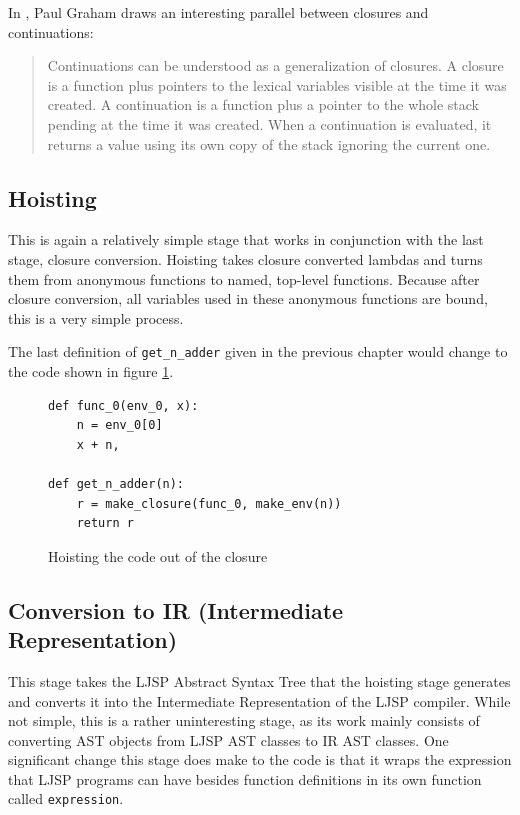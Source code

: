 \documentclass[11pt]{report}
\begin{document}
In \cite{onlisp}, Paul Graham draws an interesting parallel between closures and continuations:
\begin{quote}
Continuations can be understood as a generalization of closures. A closure is a function plus pointers to the lexical variables visible at the time it was created. A continuation is a function plus a pointer to the whole stack pending at the time it was created. When a continuation is evaluated, it returns a value using its own copy of the stack ignoring the current one.
\end{quote}



\subsection{Hoisting}
This is again a relatively simple stage that works in conjunction with the last stage, closure conversion. Hoisting takes closure converted lambdas and turns them from anonymous functions to named, top-level functions. Because after closure conversion, all variables used in these anonymous functions are bound, this is a very simple process.

The last definition of \texttt{get_n_adder} given in the previous chapter would change to the code shown in figure \ref{hoisting}.

\begin{figure}[ht]
\begin{lstlisting}
def func_0(env_0, x):
    n = env_0[0]
    x + n, 
    
def get_n_adder(n):
    r = make_closure(func_0, make_env(n))
    return r
\end{lstlisting}
\caption{Hoisting the code out of the closure}
\label{hoisting}
\end{figure}

\subsection{Conversion to IR (Intermediate Representation)}
This stage takes the LJSP Abstract Syntax Tree that the hoisting stage generates and converts it into the Intermediate Representation of the LJSP compiler. While not simple, this is a rather uninteresting stage, as its work mainly consists of converting AST objects from LJSP AST classes to IR AST classes. One significant change this stage does make to the code is that it wraps the expression that LJSP programs can have besides function definitions in its own function called \texttt{expression}.
\end{document}
